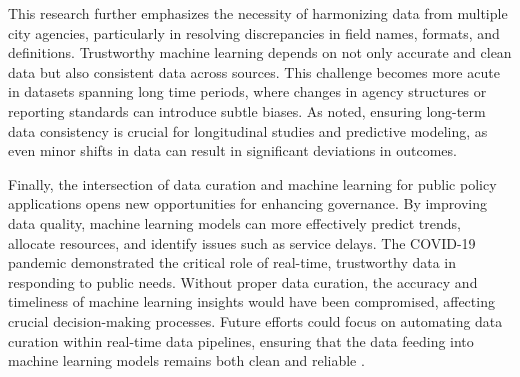 \documentclass[linenumber]{jdsart}
\begin{document}
This research further emphasizes the necessity of harmonizing data
from multiple city agencies, particularly in resolving discrepancies
in field names, formats, and definitions. Trustworthy machine learning
depends on not only accurate and clean data but also consistent data
across sources. This challenge becomes more acute in datasets spanning
long time periods, where changes in agency structures or reporting
standards can introduce subtle biases. As \citet{rahm2000data} noted,
ensuring long-term data consistency is crucial for longitudinal
studies and predictive modeling, as even minor shifts in data can
result in significant deviations in outcomes.


Finally, the intersection of data curation and machine learning for
public policy applications opens new opportunities for enhancing
governance. By improving data quality, machine learning models can
more effectively predict trends, allocate resources, and identify
issues such as service delays. The COVID-19 pandemic demonstrated the
critical role of real-time, trustworthy data in responding to public
needs. Without proper data curation, the accuracy and timeliness of
machine learning insights would have been compromised, affecting
crucial decision-making processes. Future efforts could focus on
automating data curation within real-time data pipelines, ensuring
that the data feeding into machine learning models remains both clean
and reliable \citep{chu2016data}.






\end{document}
